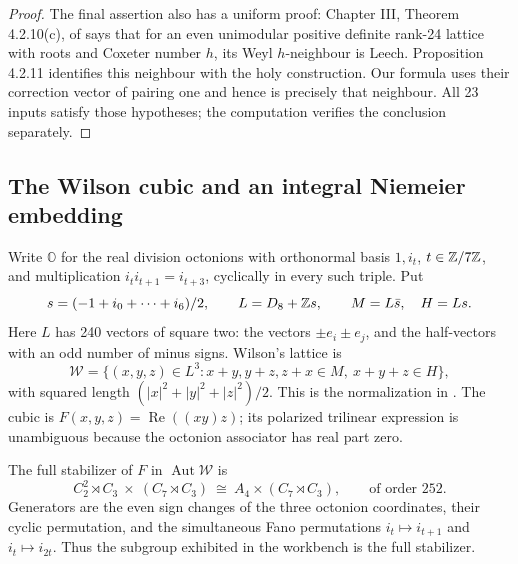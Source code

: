 \begin{proof}
The final assertion also has a uniform proof: Chapter III,
Theorem 4.2.10(c), of \citet{B_ChenevierLannes2019} says that for an
even unimodular positive definite rank-24 lattice with roots and
Coxeter number \(h\), its Weyl \(h\)-neighbour is Leech.
Proposition 4.2.11 identifies this neighbour with the holy
construction. Our formula uses their correction vector of pairing
one and hence is precisely that neighbour. All 23 inputs satisfy
those hypotheses; the computation verifies the conclusion separately.
\end{proof}

\subsection{The Wilson cubic and an integral Niemeier embedding}

Write \(\mathbb O\) for the real division octonions with orthonormal
basis \(1,i_t\), \(t\in\mathbb Z/7\mathbb Z\), and multiplication
\(i_ti_{t+1}=i_{t+3}\), cyclically in every such triple. Put
\[
 s=(-1+i_0+\cdots+i_6)/2,
 \qquad L=D_8+\mathbb Z s,\qquad M=L\bar s,\quad H=Ls.
\]
Here \(L\) has 240 vectors of square two: the vectors
\(\pm e_i\pm e_j\), and the half-vectors with an odd number of minus
signs. Wilson's lattice is
\begin{equation}\label{eq:B-Wilson}
 \mathcal W=\{(x,y,z)\in L^3:
    x+y,y+z,z+x\in M,\ x+y+z\in H\},
\end{equation}
with squared length \((|x|^2+|y|^2+|z|^2)/2\). This is the
normalization in \citet{B_Wilson2009}. The cubic is
\(F(x,y,z)=\operatorname{Re}((xy)z)\); its polarized trilinear
expression is unambiguous because the octonion associator has real
part zero.

\begin{statement}
The full stabilizer of \(F\) in \(\operatorname{Aut}\mathcal W\)
is
\[
 C_2^2\rtimes C_3\ \times\ (C_7\rtimes C_3)
 \ \cong\ A_4\times(C_7\rtimes C_3),
 \qquad\text{of order }252.
\]
Generators are the even sign changes of the three octonion
coordinates, their cyclic permutation, and the simultaneous Fano
permutations \(i_t\mapsto i_{t+1}\) and \(i_t\mapsto i_{2t}\).
Thus the subgroup exhibited in the workbench is the full stabilizer.
\end{statement}

